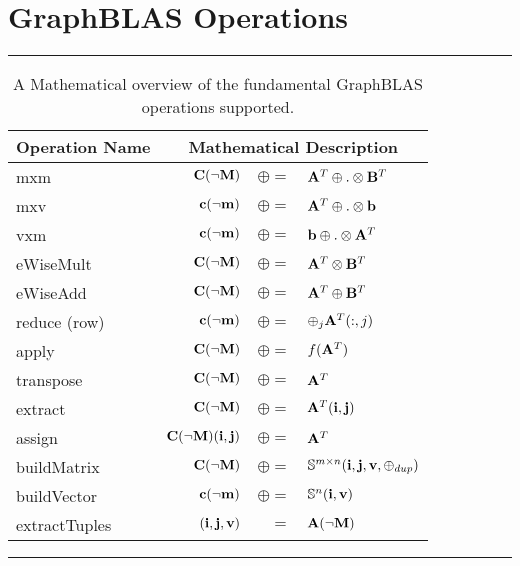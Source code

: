 \section{GraphBLAS Operations}
\label{Sec:Operations}

\begin{table*}[h]
\hrule
\begin{center}
\caption{A Mathematical overview of the fundamental GraphBLAS operations supported.}
\label{Tab:GraphBLASOps}
\begin{tabular}{l|rrl}
{\sf Operation Name} & \multicolumn{3}{c}{Mathematical Description}  \\
\hline
{\sf mxm}          & ${\bf C}(\neg{\bf M})$ & $\oplus=$ & ${\bf A}^T \oplus.\otimes {\bf B}^T$  \\
{\sf mxv}          & ${\bf c}(\neg{\bf m})$ & $\oplus=$ & ${\bf A}^T \oplus.\otimes {\bf b}$  \\
{\sf vxm}          & ${\bf c}(\neg{\bf m})$ & $\oplus=$ & ${\bf b} \oplus.\otimes {\bf A}^T$  \\
{\sf eWiseMult}    & ${\bf C}(\neg{\bf M})$ & $\oplus=$ & ${\bf A}^T \otimes {\bf B}^T$  \\
{\sf eWiseAdd}     & ${\bf C}(\neg{\bf M})$ & $\oplus=$ & ${\bf A}^T \oplus  {\bf B}^T$  \\
{\sf reduce} (row) & ${\bf c}(\neg{\bf m})$ & $\oplus=$ & $\oplus_j{\bf A}^T(:,j)$  \\
{\sf apply}        & ${\bf C}(\neg{\bf M})$ & $\oplus=$ & $f({\bf A}^T)$ \\
{\sf transpose}    & ${\bf C}(\neg{\bf M})$ & $\oplus=$ & ${\bf A}^T$ \\
{\sf extract}      & ${\bf C}(\neg{\bf M})$ & $\oplus=$ & ${\bf A}^T({\bf i},{\bf j})$ \\
{\sf assign}       & ${\bf C}(\neg{\bf M})({\bf i},{\bf j})$ & $\oplus=$ & ${\bf A}^T$ \\
{\sf buildMatrix}  & ${\bf C}(\neg{\bf M})$ & $\oplus=$ & $\mathbb{S}^{m\times n}({\bf i},{\bf j},{\bf v},\oplus_{dup})$ \\
{\sf buildVector}  & ${\bf c}(\neg{\bf m})$ & $\oplus=$ & $\mathbb{S}^{n}({\bf i},{\bf v})$ \\
{\sf extractTuples}& $({\bf i},{\bf j},{\bf v})$ & $=$ & ${\bf A}(\neg{\bf M})$ \\
\end{tabular}
\end{center}
\hrule
\end{table*}


